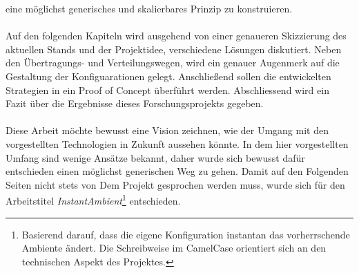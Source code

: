 eine möglichst generisches und skalierbares Prinzip zu konstruieren. 
\\\\
Auf den folgenden Kapiteln wird ausgehend von einer genaueren Skizzierung des aktuellen Stands und der Projektidee, verschiedene Lösungen diskutiert. Neben den Übertragungs- 
und Verteilungswegen, wird ein genauer Augenmerk auf die Gestaltung der Konfiguarationen gelegt. Anschließend sollen die entwickelten Strategien in ein Proof of Concept 
überführt werden. Abschliessend wird ein Fazit über die Ergebnisse dieses Forschungsprojekts gegeben. 
\\\\
Diese Arbeit möchte bewusst eine Vision zeichnen, wie der Umgang mit den vorgestellten Technologien in Zukunft aussehen könnte. In dem hier vorgestellten Umfang sind wenige
Ansätze bekannt, daher wurde sich bewusst dafür entschieden einen möglichst generischen Weg zu gehen. Damit auf den Folgenden Seiten nicht stets von \glqq Dem Projekt\grqq 
gesprochen werden muss, wurde sich für den Arbeitstitel \emph{InstantAmbient}\footnote{Basierend darauf, dass die eigene Konfiguration instantan das vorherrschende Ambiente 
ändert. Die Schreibweise im CamelCase orientiert sich an den technischen Aspekt des Projektes.} entschieden.

